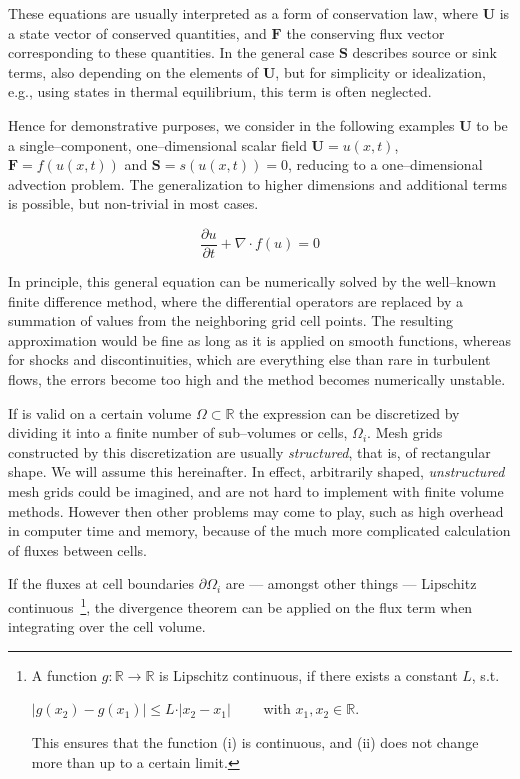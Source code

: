 These equations are usually interpreted as a form of conservation law, where $\textbf{U}$ is a state vector of conserved quantities, and $\textbf{F}$ the conserving flux vector corresponding to these quantities.
In the general case $\textbf{S}$ describes source or sink terms, also depending on the elements of $\textbf{U}$, but for simplicity or idealization, e.g., using states in thermal equilibrium, this term is often neglected.

Hence for demonstrative purposes, we consider in the following examples $\textbf{U}$ to be a single--component, one--dimensional scalar field $\textbf{U} = u(x, t)$, $\textbf{F} = f(u(x, t))$ and $\textbf{S} = s(u(x, t)) = 0$, reducing  to a one--dimensional advection problem.
The generalization to higher dimensions and additional terms is possible, but non-trivial in most cases.

\begin{equation}
  \frac{\partial u}{\partial t} + \nabla \cdot f(u) = 0
\label{eq:1D_Advection}
\end{equation}

In principle, this general equation can be numerically solved by the well--known finite difference method, where the differential operators are replaced by a summation of values from the neighboring grid cell points.
The resulting approximation would be fine as long as it is applied on smooth functions, whereas for shocks and discontinuities, which are everything else than rare in turbulent flows, the errors become too high and the method becomes numerically unstable.

If  is valid on a certain volume $\Omega \subset \mathbb{R}$ the expression can be discretized by dividing it into a finite number of sub--volumes or cells, $\Omega_{i}$.
Mesh grids constructed by this discretization are usually \textit{structured}, that is, of rectangular shape.
We will assume this hereinafter.
In effect, arbitrarily shaped, \textit{unstructured} mesh grids could be imagined, and are not hard to implement with finite volume methods.
However then other problems may come to play, such as high overhead in computer time and memory, because of the much more complicated calculation of fluxes between cells.

If the fluxes at cell boundaries $\partial\Omega_{i}$ are --- amongst other things --- Lipschitz continuous~\footnote{A function $g: \mathbb{R} \to \mathbb{R}$ is Lipschitz continuous, if there exists a constant $L$, s.t. \begin{center}$\vert g(x_{2}) - g(x_{1}) \vert \leq L\cdot\vert x_{2} - x_{1}\vert\qquad$ with $x_{1}, x_{2} \in \mathbb{R}$.\\ \end{center} This ensures that the function (i) is continuous, and (ii) does not change more than up to a certain limit.}, the divergence theorem can be applied on the flux term when integrating over the cell volume.

